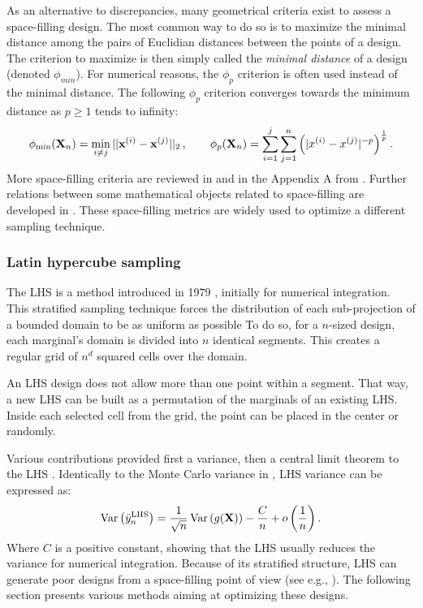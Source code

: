 As an alternative to discrepancies, many geometrical criteria exist to assess a space-filling design.
The most common way to do so is to maximize the minimal distance among the pairs of Euclidian distances between the points of a design.  
The criterion to maximize is then simply called the \textit{minimal distance} of a design (denoted $\phi_{min}$). 
For numerical reasons, the $\phi_p$ criterion is often used instead of the minimal distance. 
The following $\phi_p$ criterion converges towards the minimum distance as $p\geq1$ tends to infinity:
\begin{equation} 
    \phi_{\min}({\bf X}_n) = \min_{i \neq j} ||{\bf x}^{(i)} - {\bf x}^{(j)}||_2\, , \qquad
    \phi_p({\bf X}_n) = \sum_{i=1}^{j} \sum_{j=1}^{n} \left( |x^{(i)} - x^{(j)}|^{-p} \right)^{\frac{1}{p}}.
\end{equation}
More space-filling criteria are reviewed in \citet{abtini_2018} and in the Appendix A from \citet{daveiga_iooss_2021}. 
Further relations between some mathematical objects related to space-filling are developed in \citet{pronzato_2012}.
These space-filling metrics are widely used to optimize a different sampling technique.


\subsubsection{Latin hypercube sampling}
The LHS is a method introduced in 1979 \citep{mckay_beckman_1979}, initially for numerical integration.
This stratified sampling technique forces the distribution of each sub-projection of a bounded domain to be as uniform as possible
To do so, for a $n$-sized design, each marginal's domain is divided into $n$ identical segments.
This creates a regular grid of $n^{d}$ squared cells over the domain. 

An LHS design does not allow more than one point within a segment. 
That way, a new LHS can be built as a permutation of the marginals of an existing LHS.
Inside each selected cell from the grid, the point can be placed in the center or randomly.

Various contributions provided first a variance, then a central limit theorem to the LHS \citep{owen_1996}.
Identically to the Monte Carlo variance in , LHS variance can be expressed as:
\begin{equation}
    \operatorname{Var}\left(\Bar{y}_n^{\textrm{LHS}}\right) = \frac{1}{\sqrt{n}} \operatorname{Var}\left(g({\bf X})\right) - \frac{C}{n} + o\left( \frac1n \right). 
\end{equation}
Where $C$ is a positive constant, showing that the LHS usually reduces the variance for numerical integration. 
Because of its stratified structure, LHS can generate poor designs from a space-filling point of view (see e.g., ). 
The following section presents various methods aiming at optimizing these designs.


